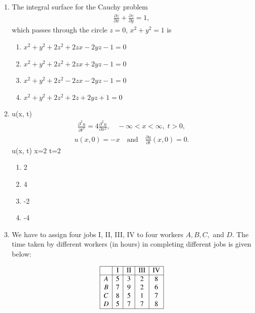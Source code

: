 \documentclass[journal]{IEEEtran}
\numberwithin{equation}{enumi}
\numberwithin{figure}{enumi}
\begin{document}
\begin{enumerate}
    
\item The integral surface for the Cauchy problem
\begin{align*}
\frac{\partial z}{\partial x} + \frac{\partial z}{\partial y} = 1,
\end{align*}
which passes through the circle $z = 0$, $x^2 + y^2 = 1$ is
\hfill{}
\begin{enumerate}
    \item $x^2 + y^2 + 2z^2 + 2zx - 2yz - 1 = 0$
    \item $x^2 + y^2 + 2z^2 + 2zx + 2yz - 1 = 0$
    \item $x^2 + y^2 + 2z^2 - 2zx - 2yz - 1 = 0$
    \item $x^2 + y^2 + 2z^2 + 2z + 2yz + 1 = 0$
\end{enumerate}


 
\item {} u(x, t) 
\begin{align*}
\frac{\partial^2 u}{\partial t^2} = 4 \frac{\partial^2 u}{\partial x^2}, \quad -\infty < x < \infty, \; t > 0,
\end{align*}
\begin{align*}
u(x, 0) = -x \quad \text{and} \quad \frac{\partial u}{\partial t}(x, 0) = 0.
\end{align*}
 u(x, t)  x=2  t=2 
\hfill{}
\begin{multicols}{4}
\begin{enumerate}
\item  2
\item  4 
\item  -2 
\item  -4
\end{enumerate}
\end{multicols}






\item We have to assign four jobs I, II, III, IV to four workers $A, B, C,$ and $D$. The time taken by different workers (in hours) in completing different jobs is given below:

\begin{align*}
\begin{array}{|c|c|c|c|c|}
   \hline
    & \text{I} & \text{II} & \text{III} & \text{IV} \\
    \hline
    A & 5 & 3 & 2 & 8 \\
    B & 7 & 9 & 2 & 6 \\
    C & 8 & 5 & 1 & 7 \\
    D & 5 & 7 & 7 & 8 \\
    \hline
\end{array}
\end{align*}


\end{enumerate}
\end{document}

